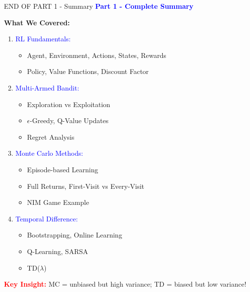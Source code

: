 \documentclass[8pt]{beamer}
\begin{document}
\begin{frame}{END OF PART 1 - Summary}
\fontsize{6.5}{7.5}\selectfont
\textcolor{blue}{\textbf{Part 1 - Complete Summary}}

\textbf{What We Covered:}

\begin{enumerate}
\item \textcolor{blue}{RL Fundamentals:}
\begin{itemize}
\item Agent, Environment, Actions, States, Rewards
\item Policy, Value Functions, Discount Factor
\end{itemize}

\item \textcolor{blue}{Multi-Armed Bandit:}
\begin{itemize}
\item Exploration vs Exploitation
\item $\epsilon$-Greedy, Q-Value Updates
\item Regret Analysis
\end{itemize}

\item \textcolor{blue}{Monte Carlo Methods:}
\begin{itemize}
\item Episode-based Learning
\item Full Returns, First-Visit vs Every-Visit
\item NIM Game Example
\end{itemize}

\item \textcolor{blue}{Temporal Difference:}
\begin{itemize}
\item Bootstrapping, Online Learning
\item Q-Learning, SARSA
\item TD($\lambda$)
\end{itemize}
\end{enumerate}

\textcolor{red}{\textbf{Key Insight:}} MC = unbiased but high variance; TD = biased but low variance!
\end{frame}
\end{document}
